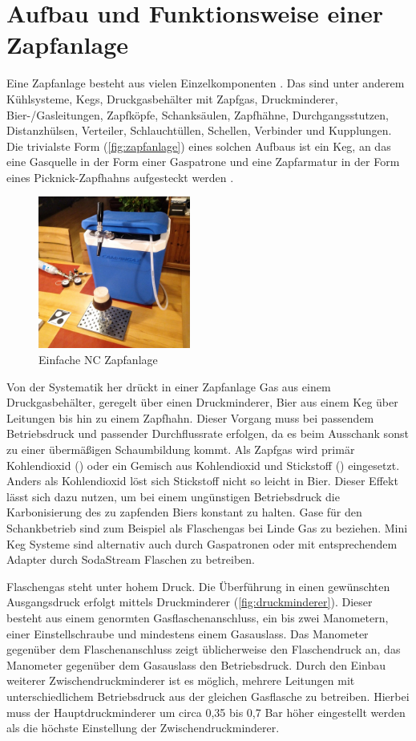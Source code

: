 \documentclass[a4paper,parskip=half]{scrartcl}
\begin{document}
\section*{Aufbau und Funktionsweise einer Zapfanlage}

Eine Zapfanlage besteht aus vielen Einzelkomponenten \autocite{BrewersAssociation2019}. Das sind unter anderem Kühlsysteme, Kegs, Druckgasbehälter mit Zapfgas, Druckminderer, Bier-/Gasleitungen, Zapfköpfe, Schanksäulen, Zapfhähne, Durchgangsstutzen, Distanzhülsen, Verteiler, Schlauchtüllen, Schellen, Verbinder und Kupplungen. Die trivialste Form (\autoref{fig:zapfanlage}) eines solchen Aufbaus ist ein Keg, an das eine Gasquelle in der Form einer Gaspatrone und eine Zapfarmatur in der Form eines Picknick-Zapfhahns aufgesteckt werden \autocite{Westemeier1995}.

\begin{figure}[h]
\centering
\includegraphics[width=5cm]{images/zapfanlage.jpg}
\caption{Einfache NC Zapfanlage}
\label{fig:zapfanlage}
\end{figure}

Von der Systematik her drückt in einer Zapfanlage Gas aus einem Druckgasbehälter, geregelt über einen Druckminderer, Bier aus einem Keg über Leitungen bis hin zu einem Zapfhahn. Dieser Vorgang muss bei passendem Betriebsdruck und passender Durchflussrate erfolgen, da es beim Ausschank sonst zu einer übermäßigen Schaumbildung kommt. Als Zapfgas wird primär Kohlendioxid () oder ein Gemisch aus Kohlendioxid und Stickstoff () eingesetzt. Anders als Kohlendioxid löst sich Stickstoff nicht so leicht in Bier. Dieser Effekt lässt sich dazu nutzen, um bei einem ungünstigen Betriebsdruck die Karbonisierung des zu zapfenden Biers konstant zu halten. \autocite{BrewersAssociation2019} Gase für den Schankbetrieb sind zum Beispiel als Flaschengas bei Linde Gas zu beziehen. Mini Keg Systeme sind alternativ auch durch Gaspatronen oder mit entsprechendem Adapter durch SodaStream Flaschen zu betreiben.

Flaschengas steht unter hohem Druck. Die Überführung in einen gewünschten Ausgangsdruck erfolgt mittels Druckminderer (\autoref{fig:druckminderer}). Dieser besteht aus einem genormten Gasflaschenanschluss, ein bis zwei Manometern, einer Einstellschraube und mindestens einem Gasauslass. Das Manometer gegenüber dem Flaschenanschluss zeigt üblicherweise den Flaschendruck an, das Manometer gegenüber dem Gasauslass den Betriebsdruck. Durch den Einbau weiterer Zwischendruckminderer ist es möglich, mehrere Leitungen mit unterschiedlichem Betriebsdruck aus der gleichen Gasflasche zu betreiben. Hierbei muss der Hauptdruckminderer um circa 0,35 bis 0,7 Bar höher eingestellt werden als die höchste Einstellung der Zwischendruckminderer. \autocite{BrewersAssociation2019}
\end{document}
